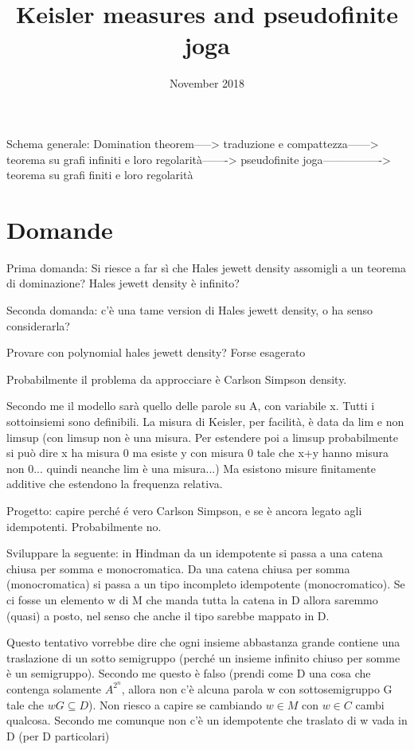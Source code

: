 \documentclass{article}
\title{Keisler measures and pseudofinite joga}
\author{}
\date{November 2018}
\begin{document}
\maketitle

Schema generale: Domination theorem-----> traduzione e compattezza------> teorema su grafi infiniti e loro regolarità-------> pseudofinite joga----------------> teorema su grafi finiti e loro regolarità
\section{Domande}

Prima domanda: Si riesce a far sì che Hales jewett density assomigli a un teorema di dominazione? Hales jewett density è infinito?

Seconda domanda: c'è una tame version di Hales jewett density, o ha senso considerarla?

Provare con polynomial hales jewett density? Forse esagerato

Probabilmente il problema da approcciare è Carlson Simpson density.

Secondo me il modello sarà quello delle parole su A, con variabile x. Tutti i sottoinsiemi sono definibili. La misura di Keisler, per facilità, è data da lim e non limsup (con limsup non è una misura. Per estendere poi a limsup probabilmente si può dire x ha misura 0 ma esiste y con misura 0 tale che x+y hanno misura non 0... quindi neanche lim è una misura...)
Ma esistono misure finitamente additive che estendono la frequenza relativa.

Progetto: capire perché é vero Carlson Simpson, e se è ancora legato agli idempotenti. Probabilmente no.

Sviluppare la seguente: in Hindman da un idempotente si passa a una catena chiusa per somma e monocromatica. Da una catena chiusa per somma (monocromatica) si passa a un tipo incompleto idempotente (monocromatico). Se ci fosse un elemento w di M che manda tutta la catena in D allora saremmo (quasi) a posto, nel senso che anche il tipo sarebbe mappato in D. 

Questo tentativo vorrebbe dire che ogni insieme abbastanza grande contiene una traslazione di un sotto semigruppo (perché un insieme infinito chiuso per somme è un semigruppo). Secondo me questo è falso (prendi come D una cosa che contenga solamente $\displaystyle A^{2^n}$, allora non c'è alcuna parola w con sottosemigruppo G tale che $wG\subseteq D$). Non riesco a capire se cambiando $w\in M$ con $w\in C$ cambi qualcosa. Secondo me comunque non c'è un idempotente che traslato di w vada in D (per D particolari)
\end{document}
